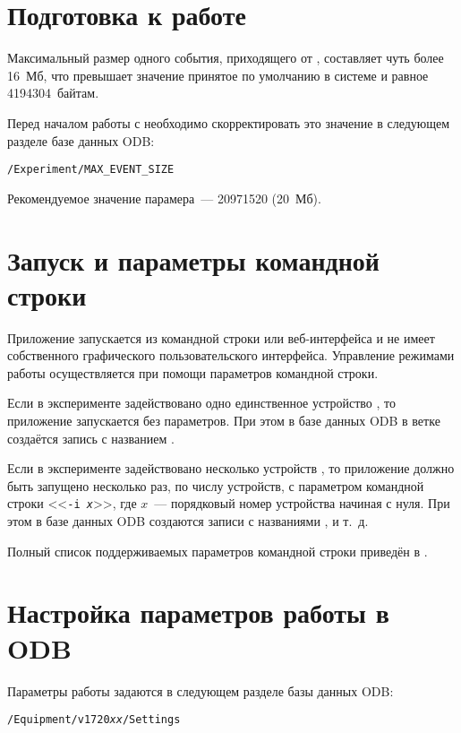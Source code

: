 \section{Подготовка к работе}

Максимальный размер одного события, приходящего от \DEVICE{}, составляет чуть более 16~Мб, что превышает значение принятое по умолчанию в системе \MIDAS{} и равное 4194304~байтам.

Перед началом работы с  необходимо скорректировать это значение в следующем разделе базе данных ODB:

\medskip
{\tt /Experiment/MAX\_EVENT\_SIZE}
\medskip

Рекомендуемое значение парамера~--- 20971520 (20~Мб).

\section{Запуск и параметры командной строки}

Приложение  запускается из командной строки или веб-ин\-тер\-фейса \MIDAS{} \cite{MidasWikiMhttpd} и не имеет собственного графического пользовательского интерфейса. Управление режимами работы осуществляется при помощи параметров командной строки.

Если в эксперименте задействовано одно единственное устройство \DEVICE{}, то приложение  запускается без параметров. При этом в базе данных ODB в ветке  \cite{MidasWikiEquipment} создаётся запись с названием .

Если в эксперименте задействовано несколько устройств \DEVICE{}, то приложение  должно быть запущено несколько раз, по числу устройств, с параметром командной строки <<{\tt -i {\it x}}>>, где $x$~--- порядковый номер устройства начиная с нуля. При этом в базе данных ODB создаются записи с названиями ,  и т.~д.

Полный список поддерживаемых параметров командной строки приведён в \cite{MidasWikiFrontend}. 

\section{Настройка параметров работы в ODB}

Параметры работы \DEVICE{} задаются в следующем разделе базы данных ODB:

\medskip

{\tt /Equipment/v1720{\it xx}/Settings}

